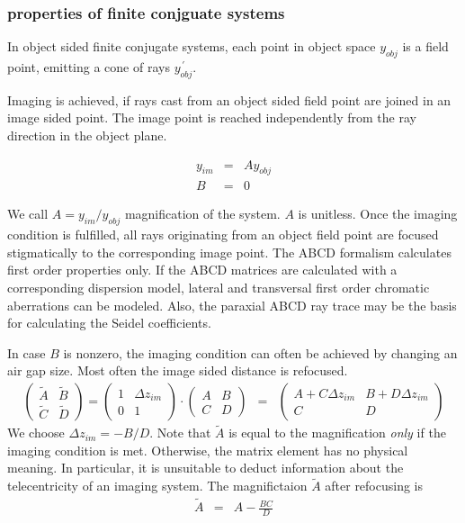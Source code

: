 \documentclass[12pt,a4paper,twoside,openright,BCOR10mm,headsepline,titlepage,abstracton,chapterprefix,final]{scrreprt}
\begin{document}
\subsubsection{properties of finite conjguate systems}
In object sided finite conjugate systems, each point in object space $y_{obj}$ is a field point, 
emitting a cone of rays $y_{obj}^{\,\prime}$.

Imaging is achieved, if rays cast from an object sided field point are joined in an image sided point.
The image point is reached independently from the ray direction in the object plane.

\begin{eqnarray}
   y_{im} &=& A y_{obj} \\
   B &=& 0
\end{eqnarray}

We call $A = y_{im} / y_{obj}$ magnification of the system.
$A$ is unitless.
Once the imaging condition is fulfilled, all rays originating from an object field point are focused stigmatically to the corresponding image point. 
The ABCD formalism calculates first order properties only.
If the ABCD matrices are calculated with a corresponding dispersion model, lateral and transversal first order chromatic aberrations can be modeled.
Also, the paraxial ABCD ray trace may be the basis for calculating the Seidel coefficients.

In case $B$ is nonzero, the imaging condition can often be achieved by changing an air gap size. Most often the image sided distance is refocused.
\begin{eqnarray}
 \begin{pmatrix}
  \tilde{A} & \tilde{B} \\ \tilde{C} & \tilde{D}
 \end{pmatrix}
 =
 \begin{pmatrix}
  1 & \Delta z_{im} \\ 0 & 1
 \end{pmatrix}
 \cdot
 \begin{pmatrix}
  A & B \\ C & D
 \end{pmatrix}
 &=&
  \begin{pmatrix}
  A + C \Delta z_{im} & B + D \Delta z_{im} \\ C & D
 \end{pmatrix}
 \label{eq:abcd_refocusing}
\end{eqnarray}
We choose $\Delta z_{im} = - B / D $. Note that $\tilde{A}$ is equal to the magnification \emph{only} if the imaging condition is met. 
Otherwise, the matrix element has no physical meaning.
In particular, it is unsuitable to deduct information about the telecentricity of an imaging system.
The magnifictaion $\tilde{A}$ after refocusing is
\begin{eqnarray}
 \tilde{A} &=& A - \frac{BC}{D}
\end{eqnarray}
\end{document}
